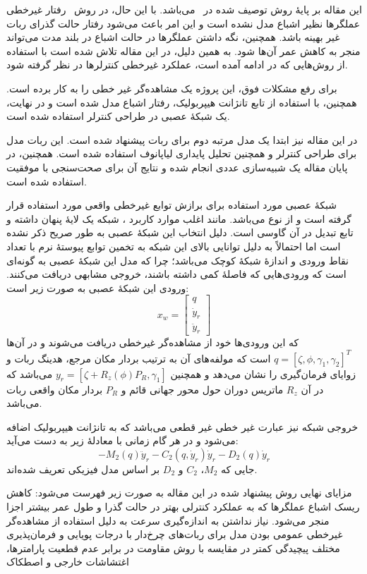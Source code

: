 این مقاله بر پایهٔ روش  توصیف شده در \آ\ می‌باشد. با این حال، در روش \آ\ رفتار غیرخطی عملگرها نظیر اشباع مدل نشده است و این امر باعث می‌شود رفتار حالت گذرای ربات غیر بهینه باشد. همچنین، نگه داشتن عملگرها در حالت اشباع در بلند مدت می‌تواند منجر به کاهش عمر آن‌ها شود. به همین دلیل، در این مقاله تلاش شده است با استفاده از روش‌هایی که در ادامه آمده است، عملکرد غیرخطی کنترلرها در نظر گرفته شود.

برای رفع مشکلات فوق، این پروژه یک مشاهده‌گر غیر خطی را به کار برده است. همچنین، با استفاده از تابع تانژانت هیپربولیک، رفتار اشباع مدل شده است و در نهایت، یک شبکهٔ عصبی در طراحی کنترلر استفاده شده است.

در این مقاله نیز ابتدا یک مدل مرتبه دوم برای ربات پیشنهاد شده است. این ربات مدل برای طراحی کنترلر و همچنین تحلیل پایداری لیاپانوف استفاده شده است. همچنین، در پایان مقاله یک شبیه‌سازی عددی انجام شده و نتایج آن برای صحت‌سنجی با موفقیت استفاده شده است.

شبکهٔ عصبی مورد استفاده برای برازش توابع غیرخطی واقعی مورد استفاده قرار گرفته است و از نوع  می‌باشد. مانند اغلب موارد کاربرد ، شبکه یک لایهٔ پنهان داشته و تابع تبدیل در آن گاوسی است. دلیل انتخاب این شبکهٔ عصبی به طور صریح ذکر نشده است اما احتمالاً به دلیل توانایی بالای این شبکه به تخمین توابع پیوستهٔ نرم با تعداد نقاط ورودی و اندازهٔ شبکهٔ کوچک می‌باشد؛ چرا که مدل این شبکهٔ عصبی به گونه‌ای است که ورودی‌هایی که فاصلهٔ کمی داشته باشند، خروجی مشابهی دریافت می‌کنند. ورودی این شبکهٔ عصبی به صورت زیر است:
\begin{equation}
	x_w = \left[
	\begin{matrix}
		q \\ \dot{y}_r \\ \ddot{y}_r
	\end{matrix}
	\right]
\end{equation}
که این ورودی‌ها خود از مشاهده‌گر غیرخطی دریافت می‌شوند و در آن‌ها
$q = [\zeta, \phi, \gamma_1, \gamma_2]^T$
است که مولفه‌های آن به ترتیب بردار مکان مرجع، هدینگ ربات و زوایای فرمان‌گیری را نشان می‌دهد و همچنین
$y_r = [\zeta + R_z(\phi) P_R, \gamma_1 ]$
می‌باشد که در آن $R_z$ ماتریس دوران حول محور جهانی قائم و $P_R$ بردار مکان واقعی ربات می‌باشد.

خروجی شبکه نیز عبارت غیر خطی غیر قطعی می‌باشد که به تانژانت هیپربولیک اضافه می‌شود و در هر گام زمانی با معادلهٔ زیر به دست می‌آید:
\begin{equation}
	-M_2(q) \ddot{y}_r - C_2 (q, \dot{y}_r) \dot{y}_r - D_2(q) \dot{y}_r
\end{equation}
جایی که $M_2$، $C_2$ و $D_2$ بر اساس مدل فیزیکی تعریف شده‌اند.

مزایای نهایی روش پیشنهاد شده در این مقاله به صورت زیر فهرست می‌شود:
 کاهش ریسک اشباع عملگرها که به عملکرد کنترلی بهتر در حالت گذرا و طول عمر بیشتر اجزا منجر می‌شود.
 نیاز نداشتن به اندازه‌گیری سرعت به دلیل استفاده از مشاهده‌گر غیرخطی
 عمومی بودن مدل برای ربات‌های چرخ‌دار با درجات پویایی و فرمان‌پذیری مختلف
 پیچیدگی کمتر در مقایسه با روش 
 مقاومت در برابر عدم قطعیت پارامترها، اغتشاشات خارجی و اصطکاک
